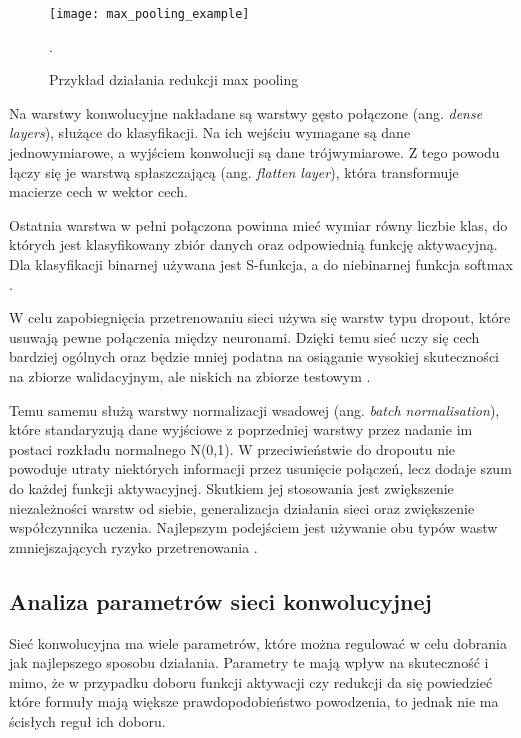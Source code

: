 {\begin{figure}[h!]
	\centering
	\centering
		\texttt{[image: max\_pooling\_example]}	
	\caption{Przykład działania redukcji max pooling}.
	\label{fig:max_pooling_example}
\end{figure}


Na warstwy konwolucyjne nakładane są warstwy gęsto połączone (ang. \textit{dense layers}), służące do klasyfikacji. Na  ich wejściu wymagane są dane jednowymiarowe, a wyjściem konwolucji są dane trójwymiarowe. Z tego powodu łączy się je warstwą spłaszczającą (ang. \textit{flatten layer}), która transformuje macierze cech w wektor cech.

Ostatnia warstwa w pełni połączona powinna mieć wymiar równy liczbie klas, do których jest klasyfikowany zbiór danych oraz odpowiednią funkcję aktywacyjną. Dla klasyfikacji binarnej używana jest S-funkcja, a do niebinarnej funkcja softmax \cite{Chollet2017DeepLW}.

W celu zapobiegnięcia przetrenowaniu sieci używa się warstw typu dropout, które usuwają pewne połączenia między neuronami. Dzięki temu sieć uczy się cech bardziej ogólnych oraz będzie mniej podatna na osiąganie wysokiej skuteczności na zbiorze walidacyjnym, ale niskich na zbiorze testowym \cite{Srivastava2014DropoutAS}.

Temu samemu służą warstwy normalizacji wsadowej (ang. \textit{batch normalisation}), które standaryzują dane wyjściowe z poprzedniej warstwy przez nadanie im postaci rozkładu normalnego N(0,1). W przeciwieństwie do dropoutu nie powoduje utraty niektórych informacji przez usunięcie połączeń, lecz dodaje szum do każdej funkcji aktywacyjnej. Skutkiem jej stosowania jest zwiększenie niezależności warstw od siebie, generalizacja działania sieci oraz zwiększenie współczynnika uczenia. Najlepszym podejściem jest używanie obu typów wastw zmniejszających ryzyko przetrenowania \cite{Ioffe2015BatchNA}.
}

\subsection{Analiza parametrów sieci konwolucyjnej}

Sieć konwolucyjna ma wiele parametrów, które można regulować w celu dobrania jak najlepszego sposobu działania. Parametry te mają wpływ na skuteczność i mimo, że w przypadku doboru funkcji aktywacji czy redukcji da się powiedzieć które formuły mają większe prawdopodobieństwo powodzenia, to jednak nie ma ścisłych reguł ich doboru.


